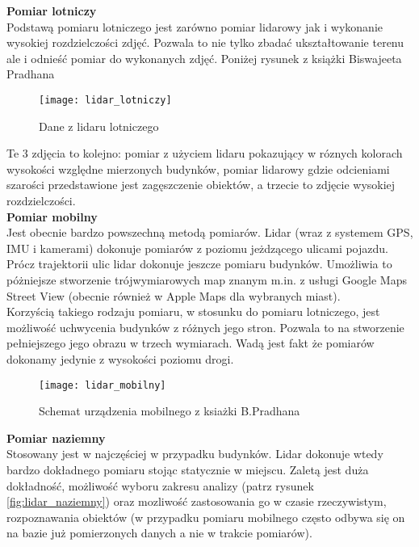 \textbf{Pomiar lotniczy}\\
Podstawą pomiaru lotniczego jest zarówno pomiar lidarowy jak i wykonanie wysokiej rozdzielczości zdjęć. Pozwala to nie tylko zbadać ukształtowanie terenu ale i odnieść pomiar do wykonanych zdjęć. Poniżej rysunek z książki Biswajeeta Pradhana

\begin{figure}[h]
    \centering
    \texttt{[image: lidar\_lotniczy]}
    \caption{Dane z lidaru lotniczego \cite{pradhan}}
    \label{fig:lidar_lotniczy}
\end{figure}
Te 3 zdjęcia to kolejno: pomiar z użyciem lidaru pokazujący w róznych kolorach wysokości względne mierzonych budynków, pomiar lidarowy gdzie odcieniami szarości przedstawione jest zagęszczenie obiektów, a trzecie to zdjęcie wysokiej rozdzielczości.\\

\textbf{Pomiar mobilny}\\
Jest obecnie bardzo powszechną metodą pomiarów. Lidar (wraz z systemem GPS, IMU i kamerami) dokonuje pomiarów z poziomu jeżdzącego ulicami pojazdu. Prócz trajektorii ulic lidar dokonuje jeszcze pomiaru budynków. Umożliwia to póżniejsze stworzenie trójwymiarowych map znanym m.in. z usługi Google Maps Street View (obecnie również w Apple Maps dla wybranych miast).\\

Korzyścią takiego rodzaju pomiaru, w stosunku do pomiaru lotniczego, jest możliwość uchwycenia budynków z różnych jego stron. Pozwala to na stworzenie pełniejszego jego obrazu w trzech wymiarach. Wadą jest fakt że pomiarów dokonamy jedynie z wysokości poziomu drogi.\\

\begin{figure}[h]
    \centering
    \texttt{[image: lidar\_mobilny]}
    \caption{Schemat urządzenia mobilnego z ksiażki B.Pradhana \cite{pradhan}}
    \label{fig:lidar_mobilny}
\end{figure}

\newpage
\textbf{Pomiar naziemny}\\
Stosowany jest w najczęściej w przypadku budynków. Lidar dokonuje wtedy bardzo dokładnego pomiaru stojąc statycznie w miejscu. Zaletą jest duża dokładność, możliwość wyboru zakresu analizy (patrz rysunek \ref{fig:lidar_naziemny}) oraz mozliwość zastosowania go w czasie rzeczywistym, rozpoznawania obiektów (w przypadku pomiaru mobilnego często odbywa się on na bazie już pomierzonych danych a nie w trakcie pomiarów).\\

